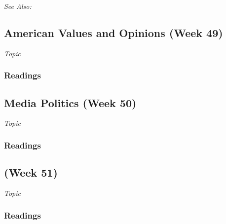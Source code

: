 \documentclass[12pt,a4paper]{article}
\newcommand{\seealso}{\noindent \emph{See Also:}\\}
\begin{document}





\seealso





\clearpage
\subsection{American Values and Opinions (Week 49)}
\emph{Topic}
\vspace{1em}
\subsubsection*{Readings}

 



\clearpage
\subsection{Media Politics (Week 50)}
\emph{Topic}
\vspace{1em}
\subsubsection*{Readings}



\clearpage
\subsection{ (Week 51)}
\emph{Topic}
\vspace{1em}
\subsubsection*{Readings}




\end{document}
